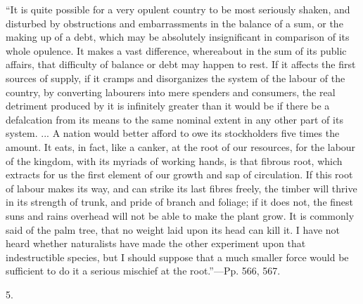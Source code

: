 ``It
is quite possible for a very opulent country to be most seriously
shaken, and disturbed by obstructions and embarrassments in the
balance of a sum, or the making up of a debt, which may be absolutely
insignificant in comparison of its whole opulence. It makes a vast
difference, whereabout in the sum of its public affairs, that
difficulty of balance or debt may happen to rest. If it affects the
first sources of supply, if it cramps and disorganizes the system of
the labour of the country, by converting labourers into mere spenders
and consumers, the real detriment produced by it is infinitely greater
than it would be if there be a defalcation from its means to the same
nominal extent in any other part of its system. ...
A nation would better afford to owe its stockholders five times the
amount. It eats, in fact, like a canker, at the root of our resources,
for the labour of the kingdom, with its myriads of working hands, is
that fibrous root, which extracts for us the first element of our
growth and sap of circulation. If this root of labour makes its way,
and can strike its last fibres freely, the timber will thrive in its
strength of trunk, and pride of branch and foliage; if it does not,
the finest suns and rains overhead will not be able to make the plant
grow. It is commonly said of the palm tree, that no weight laid upon
its head can kill it. I have not heard whether naturalists have made
the other experiment upon that indestructible species, but I should
suppose that a much smaller force would be sufficient to do it a
serious mischief at the root.''—Pp. 566, 567.

5.

